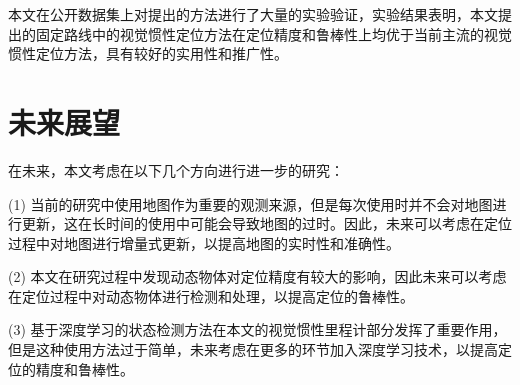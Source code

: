 本文在公开数据集上对提出的方法进行了大量的实验验证，实验结果表明，本文提出的固定路线中的视觉惯性定位方法在定位精度和鲁棒性上均优于当前主流的视觉惯性定位方法，具有较好的实用性和推广性。

\section{未来展望}

在未来，本文考虑在以下几个方向进行进一步的研究：

(1) 当前的研究中使用地图作为重要的观测来源，但是每次使用时并不会对地图进行更新，这在长时间的使用中可能会导致地图的过时。因此，未来可以考虑在定位过程中对地图进行增量式更新，以提高地图的实时性和准确性。

(2) 本文在研究过程中发现动态物体对定位精度有较大的影响，因此未来可以考虑在定位过程中对动态物体进行检测和处理，以提高定位的鲁棒性。

(3) 基于深度学习的状态检测方法在本文的视觉惯性里程计部分发挥了重要作用，但是这种使用方法过于简单，未来考虑在更多的环节加入深度学习技术，以提高定位的精度和鲁棒性。